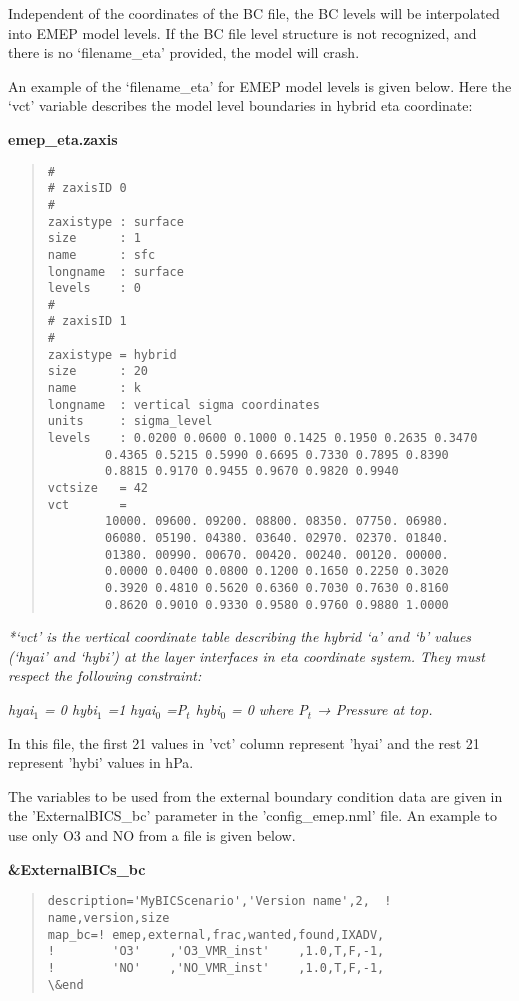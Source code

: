 Independent of the coordinates of the BC file, the BC levels will be interpolated into EMEP model levels.  If the BC file level structure is not recognized, and there 	is no `filename\_eta' provided, the model will crash. 

An example of the `filename\_eta' for EMEP model levels is given below. Here the `vct' variable describes the model level boundaries in hybrid eta coordinate: 	

{\bf emep\_eta.zaxis}
\begin{quote}
\begin{verbatim}
# 
# zaxisID 0 
# 
zaxistype : surface 
size      : 1 
name      : sfc 
longname  : surface 
levels    : 0 
# 
# zaxisID 1 
# 
zaxistype = hybrid 
size      : 20 
name      : k 
longname  : vertical sigma coordinates 
units     : sigma_level 
levels    : 0.0200 0.0600 0.1000 0.1425 0.1950 0.2635 0.3470 
	    0.4365 0.5215 0.5990 0.6695 0.7330 0.7895 0.8390 
	    0.8815 0.9170 0.9455 0.9670 0.9820 0.9940 
vctsize   = 42 
vct       =
	    10000. 09600. 09200. 08800. 08350. 07750. 06980. 
	    06080. 05190. 04380. 03640. 02970. 02370. 01840. 
	    01380. 00990. 00670. 00420. 00240. 00120. 00000. 
	    0.0000 0.0400 0.0800 0.1200 0.1650 0.2250 0.3020 
	    0.3920 0.4810 0.5620 0.6360 0.7030 0.7630 0.8160 
	    0.8620 0.9010 0.9330 0.9580 0.9760 0.9880 1.0000 
\end{verbatim}
\end{quote}


\textit {*`vct' is the vertical coordinate table describing the hybrid `a' and `b' values (`hyai' and `hybi') at the layer interfaces in eta coordinate system.  They must respect the following constraint:} 

\textit{hyai$_{1}$ = 0    hybi${_1}$ =1}
\newline
\textit{hyai${_0}$ =P${_t}$   hybi${_0}$ = 0}
\newline
\textit{where P${_t}$ → Pressure at top.}
\newline

In this file, the first 21 values in 'vct' column represent 'hyai' and the rest 21 represent 'hybi' values in hPa.  

The variables to be used from the external boundary condition data are given in the 'ExternalBICS\_bc' parameter in the 'config\_emep.nml' file.  An example to use only O3 and NO from a file is given below. 

{\bf \&ExternalBICs\_bc}
\begin{quote}
\begin{verbatim}
description='MyBICScenario','Version name',2,  ! name,version,size 
map_bc=! emep,external,frac,wanted,found,IXADV, 
!        'O3'    ,'O3_VMR_inst'    ,1.0,T,F,-1,
!        'NO'    ,'NO_VMR_inst'    ,1.0,T,F,-1,
\&end 
\end{verbatim}
\end{quote}

